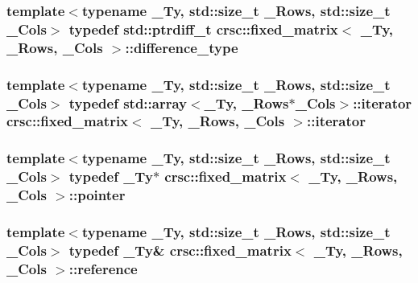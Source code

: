 \subsubsection[{\texorpdfstring{difference\+\_\+type}{difference_type}}]{\setlength{\rightskip}{0pt plus 5cm}template$<$typename \+\_\+\+Ty, std\+::size\+\_\+t \+\_\+\+Rows, std\+::size\+\_\+t \+\_\+\+Cols$>$ typedef std\+::ptrdiff\+\_\+t {\bf crsc\+::fixed\+\_\+matrix}$<$ \+\_\+\+Ty, \+\_\+\+Rows, \+\_\+\+Cols $>$\+::{\bf difference\+\_\+type}}\hypertarget{classcrsc_1_1fixed__matrix_aee3bdb836ff42652fa97227901681dcc}{}\label{classcrsc_1_1fixed__matrix_aee3bdb836ff42652fa97227901681dcc}
\subsubsection[{\texorpdfstring{iterator}{iterator}}]{\setlength{\rightskip}{0pt plus 5cm}template$<$typename \+\_\+\+Ty, std\+::size\+\_\+t \+\_\+\+Rows, std\+::size\+\_\+t \+\_\+\+Cols$>$ typedef std\+::array$<$\+\_\+\+Ty, \+\_\+\+Rows$\ast$\+\_\+\+Cols$>$\+::{\bf iterator} {\bf crsc\+::fixed\+\_\+matrix}$<$ \+\_\+\+Ty, \+\_\+\+Rows, \+\_\+\+Cols $>$\+::{\bf iterator}}\hypertarget{classcrsc_1_1fixed__matrix_a8cbb0e4470c83713e2b1dc8e6ae956bc}{}\label{classcrsc_1_1fixed__matrix_a8cbb0e4470c83713e2b1dc8e6ae956bc}
\subsubsection[{\texorpdfstring{pointer}{pointer}}]{\setlength{\rightskip}{0pt plus 5cm}template$<$typename \+\_\+\+Ty, std\+::size\+\_\+t \+\_\+\+Rows, std\+::size\+\_\+t \+\_\+\+Cols$>$ typedef \+\_\+\+Ty$\ast$ {\bf crsc\+::fixed\+\_\+matrix}$<$ \+\_\+\+Ty, \+\_\+\+Rows, \+\_\+\+Cols $>$\+::{\bf pointer}}\hypertarget{classcrsc_1_1fixed__matrix_af3fa7b73e09308460e22826c2eae30d3}{}\label{classcrsc_1_1fixed__matrix_af3fa7b73e09308460e22826c2eae30d3}
\subsubsection[{\texorpdfstring{reference}{reference}}]{\setlength{\rightskip}{0pt plus 5cm}template$<$typename \+\_\+\+Ty, std\+::size\+\_\+t \+\_\+\+Rows, std\+::size\+\_\+t \+\_\+\+Cols$>$ typedef \+\_\+\+Ty\& {\bf crsc\+::fixed\+\_\+matrix}$<$ \+\_\+\+Ty, \+\_\+\+Rows, \+\_\+\+Cols $>$\+::{\bf reference}}\hypertarget{classcrsc_1_1fixed__matrix_aee0de54210ab3caf2245732d9f79d508}{}\label{classcrsc_1_1fixed__matrix_aee0de54210ab3caf2245732d9f79d508}
